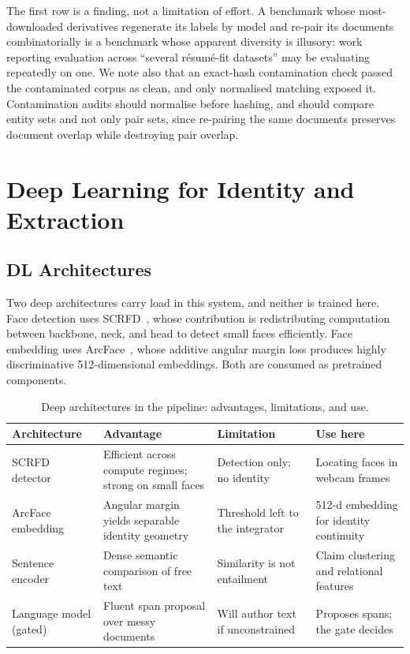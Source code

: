 The first row is a finding, not a limitation of effort. A benchmark whose
most-downloaded derivatives regenerate its labels by model and re-pair its
documents combinatorially is a benchmark whose apparent diversity is illusory:
work reporting evaluation across ``several résumé-fit datasets'' may be
evaluating repeatedly on one. We note also that an exact-hash contamination check
passed the contaminated corpus as clean, and only normalised matching exposed it.
Contamination audits should normalise before hashing, and should compare entity sets and not only pair sets, since re-pairing the same documents preserves document overlap while destroying pair overlap.

\section{Deep Learning for Identity and Extraction}
\label{sec:dl}

\subsection{DL Architectures}

Two deep architectures carry load in this system, and neither is trained here.
Face detection uses SCRFD~\cite{guo2022scrfd}, whose contribution is
redistributing computation between backbone, neck, and head to detect small faces
efficiently. Face embedding uses ArcFace~\cite{deng2019arcface}, whose additive
angular margin loss produces highly discriminative 512-dimensional embeddings.
Both are consumed as pretrained components.

\begin{table}[t]
\caption{Deep architectures in the pipeline: advantages, limitations, and use.}
\label{tab:dl-arch}
\small
\begin{tabular}{@{}p{2.4cm}p{4.4cm}p{4.4cm}p{4.2cm}@{}}
\toprule
Architecture & Advantage & Limitation & Use here \\
\midrule
SCRFD detector & Efficient across compute regimes; strong on small faces &
Detection only; no identity & Locating faces in webcam frames \\
ArcFace embedding & Angular margin yields separable identity geometry &
Threshold left to the integrator & 512-d embedding for identity continuity \\
Sentence encoder & Dense semantic comparison of free text & Similarity is not
entailment & Claim clustering and relational features \\
Language model (gated) & Fluent span proposal over messy documents & Will author
text if unconstrained & Proposes spans; the gate decides \\
\bottomrule
\end{tabular}
\end{table}

